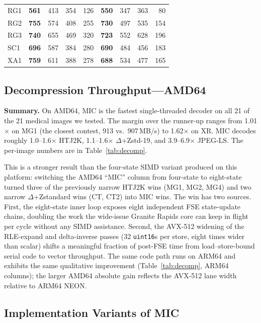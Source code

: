 \documentclass[journal]{IEEEtran}
\begin{document}
\begin{table}[htbp]
\begin{tabular}{l|rrrr|rrrr}
RG1  & \textbf{561} & 413          & 354 & 126 & \textbf{550} & 347 & 363 &  80 \\
RG2  & \textbf{755} & 574          & 408 & 255 & \textbf{730} & 497 & 535 & 154 \\
RG3  & \textbf{740} & 655          & 469 & 320 & \textbf{723} & 552 & 628 & 196 \\
SC1  & \textbf{696} & 587          & 384 & 280 & \textbf{690} & 484 & 456 & 183 \\
XA1  & \textbf{759} & 611          & 388 & 278 & \textbf{688} & 534 & 477 & 165 \\
\bottomrule
\end{tabular}
\end{table}

\subsection{Decompression Throughput---AMD64}

\textbf{Summary.} On AMD64, MIC is the fastest single-threaded decoder
on all 21 of the 21 medical images we tested. The margin over the
runner-up ranges from 1.01$\times$ on MG1 (the closest contest, 913
vs.\ 907\,MB/s) to 1.62$\times$ on XR. MIC decodes roughly
1.0--1.6$\times$ HTJ2K, 1.1--1.6$\times$ $\Delta$+Zstd-19, and
3.9--6.9$\times$ JPEG-LS. The per-image numbers are in
Table~\ref{tab:decomp}.

This is a stronger result than the four-state SIMD variant produced on
this platform: switching the AMD64 ``MIC'' column from four-state to
eight-state turned three of the previously narrow HTJ2K wins (MG1, MG2,
MG4) and two narrow $\Delta$+Zstandard wins (CT, CT2) into MIC wins.
The win has two sources. First, the eight-state inner loop exposes
eight independent FSE state-update chains, doubling the work the
wide-issue Granite Rapids core can keep in flight per cycle without any
SIMD assistance. Second, the AVX-512 widening of the RLE-expand and
delta-inverse passes (32 \texttt{uint16}s per store, eight times wider
than scalar) shifts a meaningful fraction of post-FSE time from
load--store-bound serial code to vector throughput. The same code path
runs on ARM64 and exhibits the same qualitative improvement
(Table~\ref{tab:decomp}, ARM64 columns); the larger AMD64 absolute gain reflects
the AVX-512 lane width relative to ARM64 NEON.

\subsection{Implementation Variants of MIC}
\label{subsec:variants}
\end{document}
